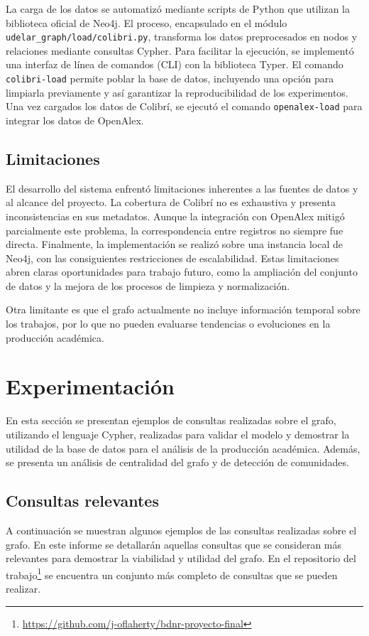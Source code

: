 \documentclass[journal]{IEEEtran}
\begin{document}
La carga de los datos se automatizó mediante scripts de Python que utilizan la biblioteca oficial de Neo4j. El proceso, encapsulado en el módulo \texttt{udelar\_graph/load/colibri.py}, transforma los datos preprocesados en nodos y relaciones mediante consultas Cypher. Para facilitar la ejecución, se implementó una interfaz de línea de comandos (CLI) con la biblioteca Typer. El comando \texttt{colibri-load} permite poblar la base de datos, incluyendo una opción para limpiarla previamente y así garantizar la reproducibilidad de los experimentos. Una vez cargados los datos de Colibrí, se ejecutó el comando \texttt{openalex-load} para integrar los datos de OpenAlex.

\subsection{Limitaciones}
El desarrollo del sistema enfrentó limitaciones inherentes a las fuentes de datos y al alcance del proyecto. La cobertura de Colibrí no es exhaustiva y presenta inconsistencias en sus metadatos. Aunque la integración con OpenAlex mitigó parcialmente este problema, la correspondencia entre registros no siempre fue directa. Finalmente, la implementación se realizó sobre una instancia local de Neo4j, con las consiguientes restricciones de escalabilidad. Estas limitaciones abren claras oportunidades para trabajo futuro, como la ampliación del conjunto de datos y la mejora de los procesos de limpieza y normalización.

Otra limitante es que el grafo actualmente no incluye información temporal sobre los trabajos, por lo que no pueden evaluarse tendencias o evoluciones en la producción académica.

\section{Experimentación}
\label{expe}
En esta sección se presentan ejemplos de consultas realizadas sobre el grafo, utilizando el lenguaje Cypher, realizadas para validar el modelo y demostrar la utilidad de la base de datos para el análisis de la producción académica. Además, se presenta un análisis de centralidad del grafo y de detección de comunidades.

\subsection{Consultas relevantes}
A continuación se muestran algunos ejemplos de las consultas realizadas sobre el grafo. En este informe se detallarán aquellas consultas que se consideran más relevantes para demostrar la viabilidad y utilidad del grafo. En el repositorio del trabajo\footnote{\url{https://github.com/j-oflaherty/bdnr-proyecto-final}} se encuentra un conjunto más completo de consultas que se pueden realizar.
\end{document}

